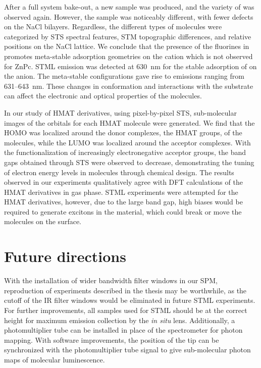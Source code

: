 After a full system bake-out, a new sample was produced, and the variety of  was observed again. However, the sample was noticeably different, with fewer defects on the NaCl bilayers. Regardless, the different types of molecules were categorized by \ac{STS} spectral features, \ac{STM} topographic differences, and relative positions on the NaCl lattice. We conclude that the presence of the fluorines in  promotes meta-stable adsorption geometries on the  cation which is not observed for ZnPc. \ac{STML} emission was detected at \SI{630}{nm} for the stable adsorption of  on the  anion. The meta-stable configurations gave rise to emissions ranging from 631--\SI{643}{nm}. These changes in conformation and interactions with the substrate can affect the electronic and optical properties of the molecules.

In our study of HMAT derivatives, using pixel-by-pixel \ac{STS}, sub-molecular images of the orbitals for each HMAT molecule were generated. We find that the HOMO was localized around the donor complexes, the HMAT groups, of the molecules, while the LUMO was localized around the acceptor complexes. With the functionalization of increasingly electronegative acceptor groups, the band gaps obtained through \ac{STS} were observed to decrease, demonstrating the tuning of electron energy levels in molecules through chemical design. The results observed in our experiments qualitatively agree with DFT calculations of the HMAT derivatives in gas phase. \ac{STML} experiments were attempted for the HMAT derivatives, however, due to the large band gap, high biases would be required to generate excitons in the material, which could break or move the molecules on the surface.




\section{Future directions}

With the installation of wider bandwidth filter windows in our \ac{SPM}, reproduction of experiments described in the thesis may be worthwhile, as the cutoff of the IR filter windows would be eliminated in future \ac{STML} experiments. For further improvements, all samples used for \ac{STML} should be at the correct height for maximum emission collection by the \textit{in situ} lens. Additionally, a photomultiplier tube can be installed in place of the spectrometer for photon mapping. With software improvements, the position of the tip can be synchronized with the photomultiplier tube signal to give sub-molecular photon maps of molecular luminescence.

